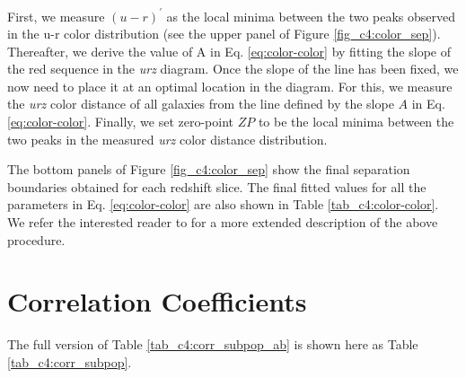 First, we measure $(u-r)^{\prime}$ as the local minima between the two peaks observed in the u-r color distribution (see the upper panel of Figure \ref{fig_c4:color_sep}). Thereafter, we derive the value of A in Eq. \ref{eq:color-color} by fitting the slope of the red sequence in the \textit{urz} diagram. Once the slope of the line has been fixed, we now need to place it at an optimal location in the diagram. For this, we measure the \textit{urz} color distance of all galaxies from the line defined by the slope $A$ in Eq. \ref{eq:color-color}. Finally, we set zero-point $ZP$ to be the local minima between the two peaks in the measured \textit{urz} color distance distribution. 

The bottom panels of Figure \ref{fig_c4:color_sep} show the final separation boundaries obtained for each redshift slice. The final fitted values for all the parameters in Eq. \ref{eq:color-color} are also shown in Table \ref{tab_c4:color-color}. We refer the interested reader to \citet{Kawin16} for a more extended description of the above procedure. 




\section{Correlation Coefficients \label{sec_c4:ap:corr_coeff}}

The full version of Table \ref{tab_c4:corr_subpop_ab} is shown here as Table \ref{tab_c4:corr_subpop}. 

